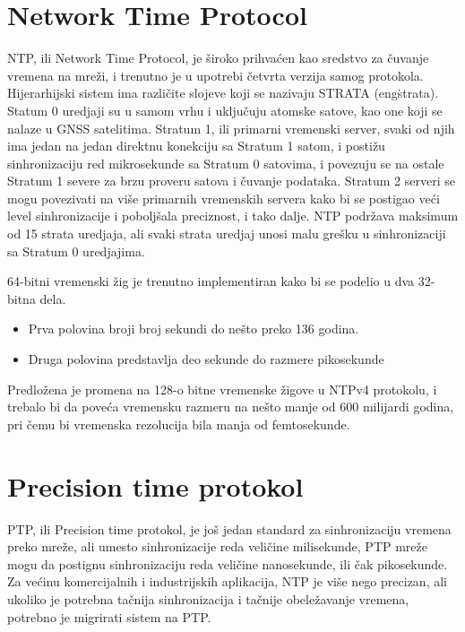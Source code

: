 \documentclass[a4paper,12pt, master]{etf}
\begin{document}
	\section{Network Time Protocol}

	NTP, ili Network Time Protocol, je \v{s}iroko prihva\'{c}en kao sredstvo za
	\v{c}uvanje vremena na mre\v{z}i, i trenutno je u upotrebi \v{c}etvrta
	verzija samog protokola. Hijerarhijski sistem ima razli\v{c}ite slojeve
	koji se nazivaju STRATA (eng\. strata). Statum 0 uredjaji su u samom vrhu i
	uklju\v{c}uju atomske satove, kao one koji se nalaze u GNSS	satelitima.
	Stratum 1, ili primarni vremenski server, svaki od njih ima jedan na jedan
	direktnu konekciju sa Stratum 1 satom, i posti\v{z}u sinhronizaciju red
	mikrosekunde sa Stratum	0 satovima, i povezuju se na ostale Stratum 1
	severe za brzu proveru satova i \v{c}uvanje	podataka. Stratum 2 serveri se
	mogu povezivati na vi\v{s}e primarnih vremenskih servera kako bi se
	postigao ve\'{c}i level sinhronizacije i pobolj\v{s}ala preciznost, i tako
	dalje. NTP podr\v{z}ava maksimum od 15 strata uredjaja, ali svaki strata
	uredjaj unosi malu gre\v{s}ku u	sinhronizaciji sa Stratum 0 uredjajima.

	64-bitni vremenski \v{z}ig je trenutno implementiran kako bi se podelio u
	dva 32-bitna dela.
	\begin{itemize}
		\item Prva polovina broji broj sekundi do ne\v{s}to preko 136 godina.
		\item Druga polovina predstavlja deo sekunde do razmere pikosekunde
	\end{itemize}

	Predlo\v{z}ena je promena na 128-o bitne vremenske \v{z}igove u NTPv4
	protokolu, i trebalo bi da pove\'{c}a vremensku razmeru na ne\v{s}to manje
	od 600 milijardi godina, pri \v{c}emu bi vremenska rezolucija bila manja od
	femtosekunde.

	\section{Precision time protokol}

	PTP, ili Precision time protokol, je jo\v{s} jedan standard za
	sinhronizaciju vremena preko mre\v{z}e, ali umesto sinhronizacije reda
	veli\v{c}ine milisekunde, PTP mre\v{z}e mogu da postignu sinhronizaciju
	reda veli\v{c}ine nanosekunde, ili \v{c}ak pikosekunde. Za ve\'{c}inu
	komercijalnih i	industrijskih aplikacija, NTP je vi\v{s}e nego precizan,
	ali ukoliko je potrebna ta\v{c}nija	sinhronizacija i ta\v{c}nije
	obele\v{z}avanje vremena, potrebno je migrirati sistem na PTP.
\end{document}
